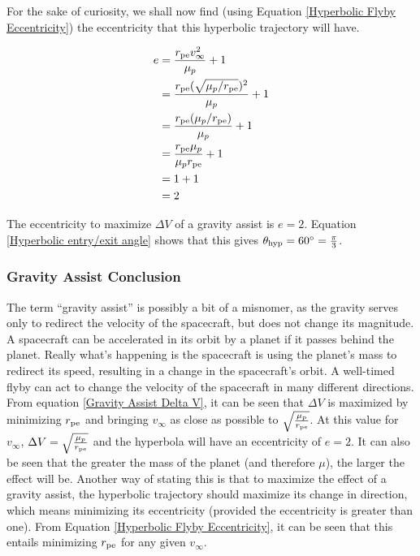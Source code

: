 \documentclass[../basicOrbitalDynamics.tex]{subfiles}
\begin{document}
For the sake of curiosity, we shall now find (using Equation \eqref{Hyperbolic Flyby Eccentricity}) the eccentricity that this hyperbolic trajectory will have.

\begin{align*}
    e & = \frac{{r}_\text{pe}v_\infty^2}{\mu_p}+1                   \\
      & = \frac{{r}_\text{pe}(\sqrt{\mu_p/{r}_\text{pe}})^2}{\mu_p}+1 \\
      & = \frac{{r}_\text{pe}(\mu_p/{r}_\text{pe})}{\mu_p}+1          \\
      & = \frac{{r}_\text{pe}\mu_p}{\mu_p {r}_\text{pe}}+1            \\
      & = 1+1                                                     \\
      & = 2
\end{align*}

The eccentricity to maximize $\Delta V$ of a gravity assist is $e=2$. Equation \eqref{Hyperbolic entry/exit angle} shows that this gives ${\theta}_\text{hyp}=60^{\circ}=\frac{\pi}{3}$.

\subsubsection{Gravity Assist Conclusion}

The term ``gravity assist'' is possibly a bit of a misnomer, as the gravity serves only to redirect the velocity of the spacecraft, but does not change its magnitude. A spacecraft can be accelerated in its orbit by a planet if it passes behind the planet. Really what's happening is the spacecraft is using the planet's mass to redirect its speed, resulting in a change in the spacecraft's orbit. A well-timed flyby can act to change the velocity of the spacecraft in many different directions. From equation \eqref{Gravity Assist Delta V}, it can be seen that $\Delta V$ is maximized by minimizing ${r}_\text{pe}$ and bringing $v_\infty$ as close as possible to $\sqrt{\frac{\mu_p}{{r}_\text{pe}}}$. At this value for $v_\infty$, $\Delta V = \sqrt{\frac{\mu_p}{{r}_\text{pe}}}$ and the hyperbola will have an eccentricity of $e=2$. It can also be seen that the greater the mass of the planet (and therefore $\mu$), the larger the effect will be. Another way of stating this is that to maximize the effect of a gravity assist, the hyperbolic trajectory should maximize its change in direction, which means minimizing its eccentricity (provided the eccentricity is greater than one). From Equation \eqref{Hyperbolic Flyby Eccentricity}, it can be seen that this entails minimizing ${r}_\text{pe}$ for any given $v_\infty$.
\end{document}
